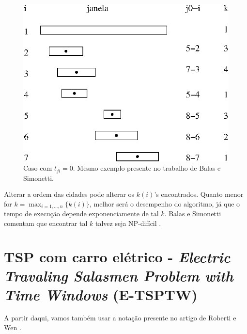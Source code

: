 \documentclass{article}
\begin{document}
\begin{figure}[ht]
  \centering
  \includegraphics[scale=.7]{fig2.eps}
  \caption{Caso com $t_{ji} = 0$. Mesmo exemplo presente no trabalho de Balas e Simonetti.}
  \label{fig2}
\end{figure}

Alterar a ordem das cidades pode alterar os $k(i)$'s encontrados. Quanto menor for $k= \max_{i=1, \dots, n}\{k(i)\}$, melhor será o desempenho do algoritmo, já que o tempo de execução depende exponenciamente de tal $k$. Balas e Simonetti comentam que encontrar tal $k$ talvez seja NP-difícil \cite{BS}.

\section*{TSP com carro elétrico - \textit {Electric Travaling Salasmen Problem with Time Windows} (E-TSPTW)}
A partir daqui, vamos também usar a notação presente no artigo de Roberti e Wen \cite{RW}.
\end{document}
